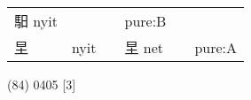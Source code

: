 \documentclass[14pt,a4paper]{scrartcl}
\begin{document}
\begin{longtable}[c]{@{}llllll@{}}
\begin{minipage}[t]{0.14\columnwidth}
馹 nyit
\strut\end{minipage} &
\begin{minipage}[t]{0.14\columnwidth}\raggedright\strut
\strut\end{minipage} &
\begin{minipage}[t]{0.14\columnwidth}\raggedright\strut
\strut\end{minipage} &
\begin{minipage}[t]{0.14\columnwidth}\raggedright\strut
pure:B
\strut\end{minipage}\tabularnewline
\begin{minipage}[t]{0.14\columnwidth}\raggedright\strut
圼
\strut\end{minipage} &
\begin{minipage}[t]{0.14\columnwidth}\raggedright\strut
nyit
\strut\end{minipage} &
\begin{minipage}[t]{0.14\columnwidth}\raggedright\strut
\strut\end{minipage} &
\begin{minipage}[t]{0.14\columnwidth}\raggedright\strut
圼 net
\strut\end{minipage} &
\begin{minipage}[t]{0.14\columnwidth}\raggedright\strut
\strut\end{minipage} &
\begin{minipage}[t]{0.14\columnwidth}\raggedright\strut
pure:A
\strut\end{minipage}\tabularnewline
\bottomrule
\end{longtable}

(84) 0405 {[}3{]}
\end{document}
